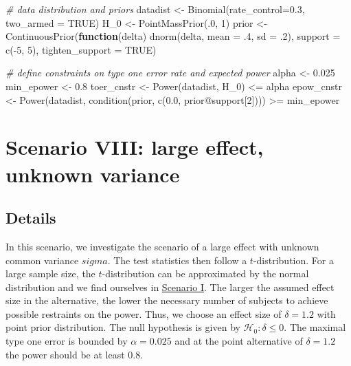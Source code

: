 \documentclass[
]{book}
\newenvironment{Shaded}{\begin{snugshade}}{\end{snugshade}}
\newcommand{\AttributeTok}[1]{\textcolor[rgb]{0.77,0.63,0.00}{#1}}
\newcommand{\CommentTok}[1]{\textcolor[rgb]{0.56,0.35,0.01}{\textit{#1}}}
\newcommand{\ConstantTok}[1]{\textcolor[rgb]{0.00,0.00,0.00}{#1}}
\newcommand{\ControlFlowTok}[1]{\textcolor[rgb]{0.13,0.29,0.53}{\textbf{#1}}}
\newcommand{\DecValTok}[1]{\textcolor[rgb]{0.00,0.00,0.81}{#1}}
\newcommand{\FloatTok}[1]{\textcolor[rgb]{0.00,0.00,0.81}{#1}}
\newcommand{\FunctionTok}[1]{\textcolor[rgb]{0.00,0.00,0.00}{#1}}
\newcommand{\NormalTok}[1]{#1}
\newcommand{\OtherTok}[1]{\textcolor[rgb]{0.56,0.35,0.01}{#1}}
\newcommand{\SpecialCharTok}[1]{\textcolor[rgb]{0.00,0.00,0.00}{#1}}
\begin{document}
\begin{Shaded}
\begin{Highlighting}[]
\CommentTok{\# data distribution and priors}
\NormalTok{datadist   }\OtherTok{\textless{}{-}} \FunctionTok{Binomial}\NormalTok{(}\AttributeTok{rate\_control=}\FloatTok{0.3}\NormalTok{, }\AttributeTok{two\_armed =} \ConstantTok{TRUE}\NormalTok{)}
\NormalTok{H\_0        }\OtherTok{\textless{}{-}} \FunctionTok{PointMassPrior}\NormalTok{(.}\DecValTok{0}\NormalTok{, }\DecValTok{1}\NormalTok{)}
\NormalTok{prior      }\OtherTok{\textless{}{-}} \FunctionTok{ContinuousPrior}\NormalTok{(}\ControlFlowTok{function}\NormalTok{(delta) }\FunctionTok{dnorm}\NormalTok{(delta, }\AttributeTok{mean =}\NormalTok{ .}\DecValTok{4}\NormalTok{, }\AttributeTok{sd =}\NormalTok{ .}\DecValTok{2}\NormalTok{),}
                              \AttributeTok{support =} \FunctionTok{c}\NormalTok{(}\SpecialCharTok{{-}}\DecValTok{5}\NormalTok{, }\DecValTok{5}\NormalTok{),}
                              \AttributeTok{tighten\_support =} \ConstantTok{TRUE}\NormalTok{)}

\CommentTok{\# define constraints on type one error rate and expected power}
\NormalTok{alpha      }\OtherTok{\textless{}{-}} \FloatTok{0.025}
\NormalTok{min\_epower }\OtherTok{\textless{}{-}} \FloatTok{0.8}
\NormalTok{toer\_cnstr }\OtherTok{\textless{}{-}} \FunctionTok{Power}\NormalTok{(datadist, H\_0) }\SpecialCharTok{\textless{}=}\NormalTok{ alpha}
\NormalTok{epow\_cnstr }\OtherTok{\textless{}{-}} \FunctionTok{Power}\NormalTok{(datadist, }\FunctionTok{condition}\NormalTok{(prior, }\FunctionTok{c}\NormalTok{(}\FloatTok{0.0}\NormalTok{, prior}\SpecialCharTok{@}\NormalTok{support[}\DecValTok{2}\NormalTok{]))) }\SpecialCharTok{\textgreater{}=}\NormalTok{ min\_epower}
\end{Highlighting}
\end{Shaded}

\hypertarget{scenarioVIII}{%
\chapter{Scenario VIII: large effect, unknown variance}\label{scenarioVIII}}

\hypertarget{details-7}{%
\section{Details}\label{details-7}}

In this scenario, we investigate the scenario of a large effect with unknown common variance \(sigma\). The test statistics then follow a \(t\)-distribution. For a large sample size, the \(t\)-distribution can be approximated by the normal distribution and we find ourselves in \protect\hyperlink{scenarioI}{Scenario I}.
The larger the assumed effect size in the alternative, the lower the necessary number of subjects to achieve possible restraints on the power. Thus, we choose an effect size of \(\delta=1.2\) with point prior distribution. The null hypothesis is given by \(\mathcal{H}_0: \delta \leq 0\). The maximal type one error is bounded by \(\alpha=0.025\) and at the point alternative of \(\delta=1.2\) the power should be at least \(0.8\).
\end{document}
